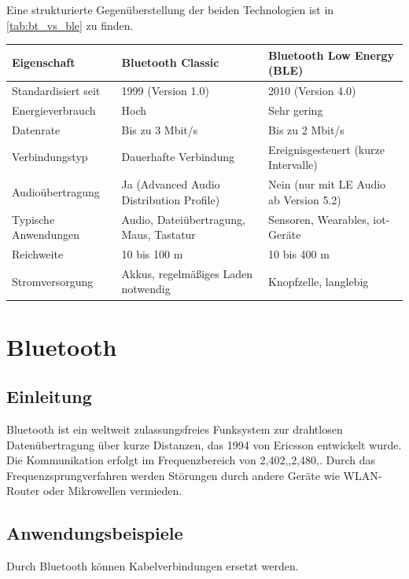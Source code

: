 \medskip
Eine strukturierte Gegenüberstellung der beiden Technologien ist in \autoref{tab:bt_vs_ble} zu finden.



\begin{table}[H]
	\centering
	\label{tab:bt_vs_ble}
	\begin{tabular}{|p{3cm}|p{4.5cm}|p{4.5cm}|}
		\hline
		\textbf{Eigenschaft} & \textbf{Bluetooth Classic} & \textbf{Bluetooth Low Energy (BLE)} \\ \hline
		Standardisiert seit & 1999 (Version 1.0) & 2010 (Version 4.0) \\ \hline
		Energieverbrauch & Hoch & Sehr gering \\ \hline
		Datenrate & Bis zu 3 Mbit/s & Bis zu 2 Mbit/s \\ \hline
		Verbindungstyp & Dauerhafte Verbindung & Ereignisgesteuert (kurze Intervalle) \\ \hline
		Audioübertragung & Ja (Advanced Audio Distribution Profile) & Nein (nur mit LE Audio ab Version 5.2) \\ \hline
		Typische Anwendungen & Audio, Dateiübertragung, Maus, Tastatur & Sensoren, Wearables, \ac{iot}-Geräte \\ \hline
		Reichweite & 10 bis 100 m & 10 bis 400 m \\ \hline
		Stromversorgung & Akkus, regelmäßiges Laden notwendig & Knopfzelle, langlebig \\ \hline
	\end{tabular}
\end{table}



\chapter{Bluetooth} \label{Bluetooth}


\section{Einleitung}
Bluetooth ist ein weltweit zulassungsfreies Funksystem zur drahtlosen Datenübertragung über kurze Distanzen, das 1994 von Ericsson entwickelt wurde. Die Kommunikation erfolgt im Frequenzbereich von 2,402,\text{--},2,480,. Durch das Frequenzsprungverfahren werden Störungen durch andere Geräte wie WLAN-Router oder Mikrowellen vermieden. \cite{Baun2022}


\section{Anwendungsbeispiele}
Durch Bluetooth k\"onnen Kabelverbindungen ersetzt werden.

